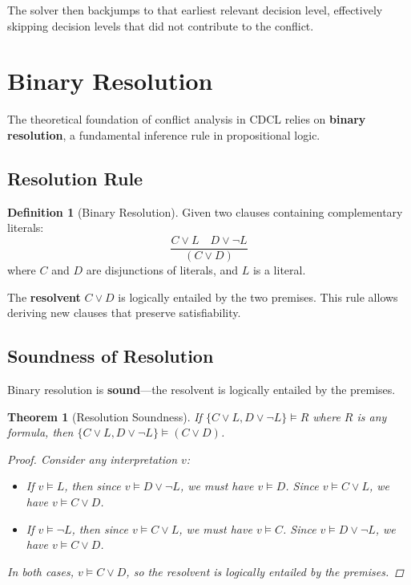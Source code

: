\documentclass[11pt,a4paper]{article}
\theoremstyle{definition}
\newtheorem{definition}{Definition}[section]
\theoremstyle{plain}
\newtheorem{theorem}{Theorem}[section]
\theoremstyle{remark}
\begin{document}
The solver then backjumps to that earliest relevant decision level, effectively skipping decision levels that did not contribute to the conflict.

\section{Binary Resolution}

The theoretical foundation of conflict analysis in CDCL relies on \textbf{binary resolution}, a fundamental inference rule in propositional logic.

\subsection{Resolution Rule}

\begin{tcolorbox}[colback=green!5!white,colframe=green!75!black,title=\textbf{Binary Resolution}]
\begin{definition}[Binary Resolution]
Given two clauses containing complementary literals:
\[
\frac{C \lor L \quad D \lor \neg L}{(C \lor D)}
\]
where $C$ and $D$ are disjunctions of literals, and $L$ is a literal.
\end{definition}
\end{tcolorbox}

The \textbf{resolvent} $C \lor D$ is logically entailed by the two premises. This rule allows deriving new clauses that preserve satisfiability.

\subsection{Soundness of Resolution}

Binary resolution is \textbf{sound}—the resolvent is logically entailed by the premises.

\begin{tcolorbox}[colback=yellow!10!white,colframe=yellow!75!black,title=\textbf{Soundness Proof}]
\begin{theorem}[Resolution Soundness]
If $\{C \lor L, D \lor \neg L\} \models R$ where $R$ is any formula, then $\{C \lor L, D \lor \neg L\} \models (C \lor D)$.

\begin{proof}
Consider any interpretation $v$:
\begin{itemize}
    \item If $v \models L$, then since $v \models D \lor \neg L$, we must have $v \models D$. Since $v \models C \lor L$, we have $v \models C \lor D$.
    \item If $v \models \neg L$, then since $v \models C \lor L$, we must have $v \models C$. Since $v \models D \lor \neg L$, we have $v \models C \lor D$.
\end{itemize}
In both cases, $v \models C \lor D$, so the resolvent is logically entailed by the premises.
\end{proof}
\end{theorem}
\end{tcolorbox}
\end{document}
